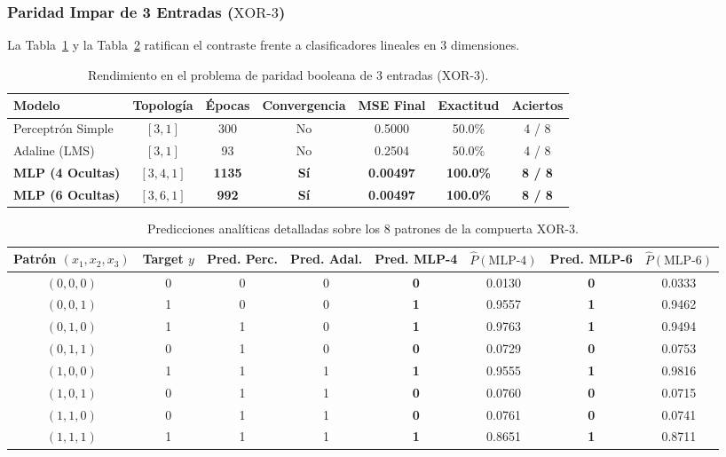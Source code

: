 \documentclass{article}
\begin{document}
\subsubsection{Paridad Impar de 3 Entradas ($\text{XOR-3}$)}
La Tabla~\ref{tab:comp_xor3} y la Tabla~\ref{tab:pred_xor3} ratifican el contraste frente a clasificadores lineales en 3 dimensiones.

\begin{table}[H]
\centering
\small
\caption{Rendimiento en el problema de paridad booleana de 3 entradas ($\text{XOR-3}$).}
\label{tab:comp_xor3}
\begin{tabularx}{\textwidth}{l c c c c c c}
\toprule
\textbf{Modelo} & \textbf{Topología} & \textbf{Épocas} & \textbf{Convergencia} & \textbf{MSE Final} & \textbf{Exactitud} & \textbf{Aciertos} \\
\midrule
Perceptrón Simple & $[3, 1]$ & 300 & No & 0.5000 & 50.0\% & 4 / 8 \\
Adaline (LMS) & $[3, 1]$ & 93 & No & 0.2504 & 50.0\% & 4 / 8 \\
\textbf{MLP (4 Ocultas)} & $[3, 4, 1]$ & \textbf{1135} & \textbf{Sí} & \textbf{0.00497} & \textbf{100.0\%} & \textbf{8 / 8} \\
\textbf{MLP (6 Ocultas)} & $[3, 6, 1]$ & \textbf{992} & \textbf{Sí} & \textbf{0.00497} & \textbf{100.0\%} & \textbf{8 / 8} \\
\bottomrule
\end{tabularx}
\end{table}

\begin{table}[H]
\centering
\small
\caption{Predicciones analíticas detalladas sobre los 8 patrones de la compuerta $\text{XOR-3}$.}
\label{tab:pred_xor3}
\begin{tabular}{c c c c c c c c}
\toprule
\textbf{Patrón $(x_1, x_2, x_3)$} & \textbf{Target $y$} & \textbf{Pred. Perc.} & \textbf{Pred. Adal.} & \textbf{Pred. MLP-4} & $\hat{P}(\text{MLP-4})$ & \textbf{Pred. MLP-6} & $\hat{P}(\text{MLP-6})$ \\
\midrule
$(0, 0, 0)$ & 0 & 0 & 0 & \textbf{0} & 0.0130 & \textbf{0} & 0.0333 \\
$(0, 0, 1)$ & 1 & 0 & 0 & \textbf{1} & 0.9557 & \textbf{1} & 0.9462 \\
$(0, 1, 0)$ & 1 & 1 & 0 & \textbf{1} & 0.9763 & \textbf{1} & 0.9494 \\
$(0, 1, 1)$ & 0 & 1 & 0 & \textbf{0} & 0.0729 & \textbf{0} & 0.0753 \\
$(1, 0, 0)$ & 1 & 1 & 1 & \textbf{1} & 0.9555 & \textbf{1} & 0.9816 \\
$(1, 0, 1)$ & 0 & 1 & 1 & \textbf{0} & 0.0760 & \textbf{0} & 0.0715 \\
$(1, 1, 0)$ & 0 & 1 & 1 & \textbf{0} & 0.0761 & \textbf{0} & 0.0741 \\
$(1, 1, 1)$ & 1 & 1 & 1 & \textbf{1} & 0.8651 & \textbf{1} & 0.8711 \\
\bottomrule
\end{tabular}
\end{table}
\end{document}
